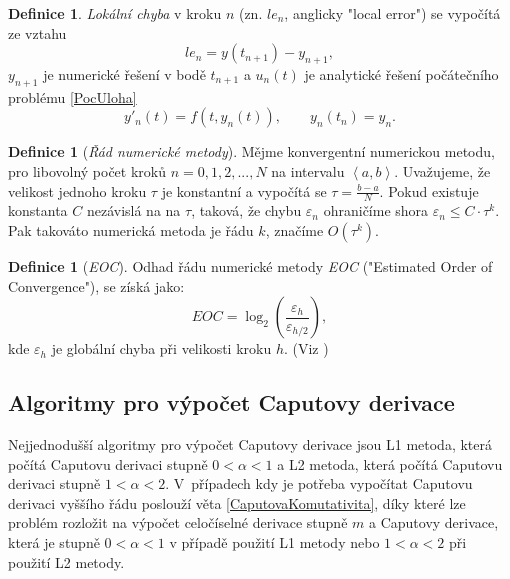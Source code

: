 \documentclass[a4paper,12pt,twoside]{article}
\theoremstyle{definition}
\newtheorem{defin}[veta]{Definice}
\theoremstyle{remark}
\numberwithin{equation}{section}
\numberwithin{table}{section}
\numberwithin{figure}{section}
\begin{document}
\begin{defin}
	\emph{Lokální chyba} v kroku $n$ (zn. $le_{n}$, anglicky "local error") se vypočítá ze vztahu
	$$le_{n} = y\left(t_{n+1}\right) - y_{n+1},$$
	$y_{n+1}$ je numerické řešení v bodě $t_{n+1}$ a $u_{n}\left(t\right)$ je analytické řešení počátečního problému \eqref{PocUloha}
	$$y'_{n}\left(t\right) = f\left(t,y_{n}\left(t\right)\right), \qquad y_{n}\left(t_{n}\right) = y_{n}.$$
\end{defin}

\begin{defin} [\emph{Řád numerické metody}]
	Mějme konvergentní numerickou metodu, pro libovolný počet kroků $n = 0,1,2, ..., N$ na intervalu $\left\langle a, b\right\rangle$. Uvažujeme, že velikost jednoho kroku $\tau$ je konstantní a vypočítá se $\tau = \frac{b-a}{N} $. Pokud existuje konstanta $C$ nezávislá na na $\tau$, taková, že chybu $\varepsilon_{n}$ ohraničíme shora $\varepsilon_{n} \leq C\cdot \tau^{k}$.
	Pak takováto numerická metoda je řádu $k$, značíme $O\left(\tau^{k}\right)$.
\end{defin}

\begin{defin} [\emph{EOC}] \label{EOC}
	Odhad řádu numerické metody \emph{EOC} ("Estimated Order of Convergence"), se získá jako:
	$$EOC = \log_{2}\left( \frac{\varepsilon_{h}}{\varepsilon_{h/2}} \right),$$
	kde $\varepsilon_{h}$ je globální chyba při velikosti kroku $h$. (Viz \cite{Garrappa2})
\end{defin}

\subsection{Algoritmy pro výpočet Caputovy derivace}
Nejjednodušší algoritmy pro výpočet Caputovy derivace jsou L1 metoda, která počítá Caputovu derivaci stupně $0<\alpha<1$ a L2 metoda, která počítá Caputovu derivaci stupně $1<\alpha<2$. V~případech kdy je potřeba vypočítat Caputovu derivaci vyššího řádu poslouží věta \ref{CaputovaKomutativita}, díky které lze problém rozložit na výpočet celočíselné derivace stupně $m$ a Caputovy derivace, která je stupně $0<\alpha<1$ v případě použití L1 metody nebo  $1<\alpha<2$ při použití L2 metody.
\end{document}
